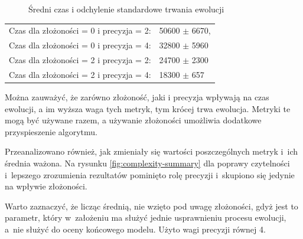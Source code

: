\begin{figure}[H]
	\caption{\label{fig:total_timemulti4}Średni czas i odchylenie standardowe trwania ewolucji}
\end{figure}

 \begin{center}
  \begin{tabular}{ll}
	Czas dla złożoności = 0 i precyzja = 2: & 50600 $\pm$ 6670, \\
	Czas dla złożoności = 0 i precyzja = 4: & 32800	$\pm$ 5960 \\
	Czas dla złożoności = 2 i precyzja = 2: & 24700 $\pm$ 2300 \\
	Czas dla złożoności = 2 i precyzja = 4: & 18300 $\pm$ 657 
  \end{tabular}
 \end{center}
 
Można zauważyć, że zarówno złożoność, jaki i precyzja wpływają na czas ewolucji, a im wyższa waga tych metryk, tym krócej trwa ewolucja. Metryki te mogą być używane razem, a używanie złożoności umożliwia dodatkowe przyspieszenie algorytmu.

Przeanalizowano również, jak zmieniały się wartości poszczególnych metryk i~ich średnia ważona. Na rysunku \ref{fig:complexity-summary} dla poprawy czytelności i~lepszego zrozumienia rezultatów pominięto rolę precyzji i~skupiono się jedynie na wpływie złożoności.

Warto zaznaczyć, że licząc średnią, nie wzięto pod uwagę złożoności, gdyż jest to parametr, który w~założeniu ma służyć jednie usprawnieniu procesu ewolucji, a~nie służyć do oceny końcowego modelu. Użyto wagi precyzji równej 4.

